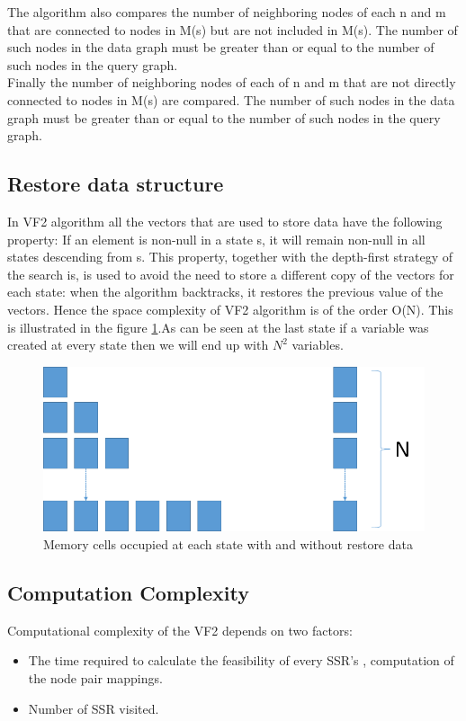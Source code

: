 The algorithm also compares the number of neighboring nodes of each n and m that are connected to nodes in M(s) but are not
included in M(s). The number of such nodes in the data graph must be greater than or equal to the number of such nodes in the query graph.\\

Finally the number of neighboring nodes of each of n and m that are not directly connected to nodes in M(s) are compared. The number of 
such nodes in the data graph must be greater than or equal to the number of such nodes in the query graph.

\subsection{Restore data structure}
In VF2 algorithm all the vectors that are used to store data have the following property: If an element is non-null in a state s, it will remain non-null in all states descending from s. This property, together with the depth-first strategy of the search is, is used to avoid the need to store a different copy of the vectors for each state: when the algorithm backtracks, it restores the previous value of the vectors. Hence the space complexity of VF2 algorithm is of the order O(N). This is illustrated in the figure \ref{fig:memManagement}.As can be seen at the last state if a variable was created at every state then we will end up with $N^2$ variables.

\begin{figure}
\includegraphics[scale=0.5]{./pics/memManagement.png}
\caption{Memory cells occupied at each state with and without restore data}
\label{fig:memManagement}
\centering
\end{figure}

\subsection{Computation Complexity}
Computational complexity of the VF2 depends on two factors: 
\begin{itemize}
\item The time required to calculate the feasibility of every SSR's , computation of the node pair mappings.
\item Number of SSR visited.
\end{itemize}


